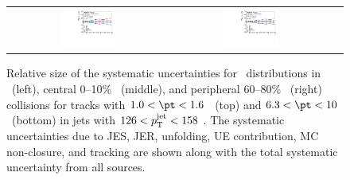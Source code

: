 \begin{figure}
{\begin{tabular}{ccc}
\includegraphics[width=0.36\textwidth]{figures/systematics/ChPS_dR_sys_PbPb_error_trk6_jet7_cent0} &
\includegraphics[width=0.36\textwidth]{figures/systematics/ChPS_dR_sys_PbPb_error_trk6_jet7_cent5} \\
\end{tabular}}
\caption{
Relative size of the systematic uncertainties for \Dptr\ distributions in \pp\ (left), central 0--10\% \pbpb\ (middle), and peripheral 60--80\% \pbpb\ (right) collisions for tracks with $1.0 < \pt < 1.6$ \GeV\ (top) and $6.3 < \pt < 10$ \GeV\ (bottom) in jets with $126 < \mbox{$p_{\mathrm{T}}^{\mathrm{jet}}$} < 158$ \GeV. The systematic uncertainties due to JES, JER, unfolding, UE contribution, MC non-closure, and tracking are shown along with the total systematic uncertainty from all sources.
}
\label{fig:Systematics_Dpt}
\end{figure}


